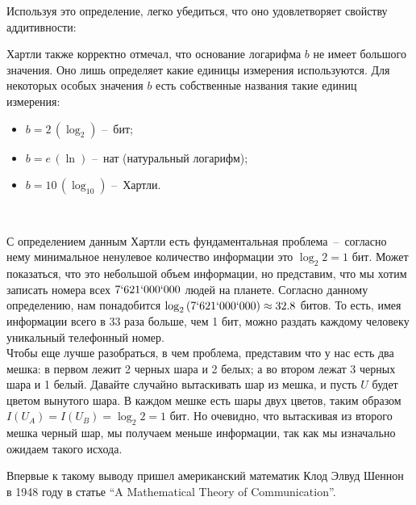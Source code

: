 Используя это определение, легко убедиться, что оно удовлетворяет свойству аддитивности: 


Хартли также корректно отмечал, что основание логарифма $b$ не имеет большого значения. Оно лишь определяет какие единицы измерения используются. Для некоторых особых значения $b$ есть собственные названия такие единиц измерения: \\

\begin{itemize}
  \item $b = 2 \, (\log_2)$ – бит;
  \item $b = e \, (\ln)$ – нат (натуральный логарифм);
  \item $b = 10 \, (\log_{10})$ – Хартли.
\end{itemize}
\

С определением данным Хартли есть фундаментальная проблема – согласно нему минимальное ненулевое количество информации это $\log_2{2} = 1$ бит. Может показаться, что это небольшой объем информации, но представим, что мы хотим записать номера всех $7`621`000`000$ людей на планете. Согласно данному определению, нам понадобится $\log_2{(7`621`000`000)} \approx 32.8$ битов. То есть, имея информации всего в 33 раза больше, чем 1 бит, можно раздать каждому человеку уникальный телефонный номер. \\

Чтобы еще лучше разобраться, в чем проблема, представим что у нас есть два мешка: в первом лежит 2 черных шара и 2 белых; а во втором лежат 3 черных шара и 1 белый. Давайте случайно вытаскивать шар из мешка, и пусть $U$ будет цветом вынутого шара. В каждом мешке есть шары двух цветов, таким образом $I(U_A) = I(U_B) = \log_2{2} = 1$ бит. Но очевидно, что вытаскивая из второго мешка черный шар, мы получаем меньше информации, так как мы изначально ожидаем такого исхода. 


Впервые к такому выводу пришел американский математик Клод Элвуд Шеннон в 1948 году в статье ``A Mathematical Theory of Communication''. 


